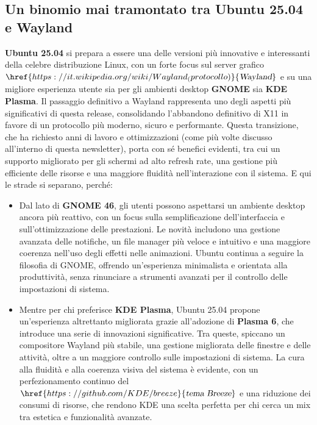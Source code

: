\documentclass[a4paper,twoside]{article}
\begin{document}
\subsection{Un binomio mai tramontato tra Ubuntu 25.04 e Wayland}
\textbf{Ubuntu 25.04} si prepara a essere una delle versioni più innovative e interessanti della celebre distribuzione Linux, con un forte focus sul server grafico $\href{https://it.wikipedia.org/wiki/Wayland_(protocollo)}{\textsl{Wayland}}$ e su una migliore esperienza utente sia per gli ambienti desktop \textbf{GNOME} sia \textbf{KDE Plasma}. Il passaggio definitivo a Wayland rappresenta uno degli aspetti più significativi di questa release, consolidando l'abbandono definitivo di X11 in favore di un protocollo più moderno, sicuro e performante. Questa transizione, che ha richiesto anni di lavoro e ottimizzazioni (come più volte discusso all'interno di questa newsletter), porta con sé benefici evidenti, tra cui un supporto migliorato per gli schermi ad alto refresh rate, una gestione più efficiente delle risorse e una maggiore fluidità nell'interazione con il sistema. E qui le strade si separano, perché:

\begin{itemize}
\item Dal lato di \textbf{GNOME 46}, gli utenti possono aspettarsi un ambiente desktop ancora più reattivo, con un focus sulla semplificazione dell'interfaccia e sull'ottimizzazione delle prestazioni. Le novità includono una gestione avanzata delle notifiche, un file manager più veloce e intuitivo e una maggiore coerenza nell'uso degli effetti nelle animazioni. Ubuntu continua a seguire la filosofia di GNOME, offrendo un'esperienza minimalista e orientata alla produttività, senza rinunciare a strumenti avanzati per il controllo delle impostazioni di sistema.
\item Mentre per chi preferisce \textbf{KDE Plasma}, Ubuntu 25.04 propone un'esperienza altrettanto migliorata grazie all'adozione di \textbf{Plasma 6}, che introduce una serie di innovazioni significative. Tra queste, spiccano un compositore Wayland più stabile, una gestione migliorata delle finestre e delle attività, oltre a un maggiore controllo sulle impostazioni di sistema. La cura alla fluidità e alla coerenza visiva del sistema è evidente, con un perfezionamento continuo del $\href{https://github.com/KDE/breeze}{\textsl{tema Breeze}}$ e una riduzione dei consumi di risorse, che rendono KDE una scelta perfetta per chi cerca un mix tra estetica e funzionalità avanzate.
\end{itemize}
\end{document}
